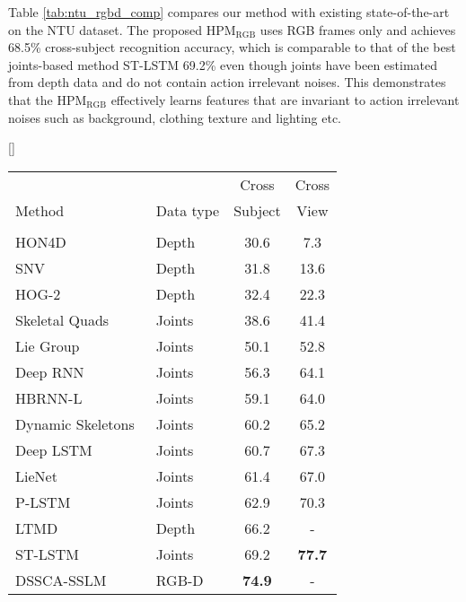 \documentclass[twocolumn]{svjour3}          \smartqed  \usepackage{graphicx}
\begin{document}
Table \ref{tab:ntu_rgbd_comp} compares our method with existing state-of-the-art on the NTU dataset. The proposed HPM$_{\mathrm{RGB}}$ uses RGB frames only and achieves 68.5\% cross-subject recognition accuracy, which is comparable to that of the best joints-based method ST-LSTM\citep{liu2016spatio} 69.2\% even though joints have been estimated from depth data and do not contain action irrelevant noises. This demonstrates that the HPM$_{\mathrm{RGB}}$ effectively learns features that are invariant to action irrelevant noises such as background, clothing texture and lighting etc.


\begin{table*}
[\FBwidth]
{\caption{Action recognition accuracy (\%) on the NTU RGB+D Human Activity Dataset. Our RGB only (HPM$_{\mathrm{RGB}}$+Traj) accuracies are higher than the nearest competitors which use RGB-D or Joints data. Our RGB-D method (HPM$_{\mathrm{RGB}}$+ HPM$_{\mathrm{3D}}$+Traj) outperforms all methods by significant margins in both settings}
\label{tab:ntu_rgbd_comp}}
{
\begin{tabular}{llcc}
\hline\noalign{\smallskip}
\multicolumn{1}{c}{} &  & Cross & Cross \\
Method & Data type & Subject & View \\
\noalign{\smallskip}\hline\noalign{\smallskip}
\multicolumn{ 3}{c}{\textbf{Baseline}} &  \\ \noalign{\smallskip}\hline\noalign{\smallskip}

HON4D~\citep{HON4D} & Depth & 30.6 & 7.3 \\ SNV~\citep{yang2014super} & Depth & 31.8 & 13.6 \\ HOG-2~\citep{ohn2013joint} & Depth & 32.4 & 22.3 \\ Skeletal Quads~\citep{evangelidis2014skeletal} & Joints & 38.6 & 41.4 \\ Lie Group~\citep{vemulapalli2014human} & Joints & 50.1 & 52.8 \\ Deep RNN~\citep{shahroudy2016ntu} & Joints & 56.3 & 64.1 \\ HBRNN-L~\citep{du2015hierarchical} & Joints & 59.1 & 64.0 \\ Dynamic Skeletons~\citep{hu2015jointly} & Joints & 60.2 & 65.2 \\ Deep LSTM~\citep{shahroudy2016ntu} & Joints & 60.7 & 67.3 \\ LieNet~\citep{huang2016deep} & Joints & 61.4 & 67.0 \\
P-LSTM~\citep{shahroudy2016ntu} & Joints & 62.9 & 70.3 \\ LTMD~\citep{luo2017unsupervised} & Depth & 66.2 & - \\
ST-LSTM~\citep{liu2016spatio} & Joints & 69.2 & \textbf{77.7} \\ DSSCA-SSLM~\citep{shahroudy2017deep} & RGB-D & \textbf{74.9} & - \\ 





\end{tabular}}
\end{table*}
\end{document}
